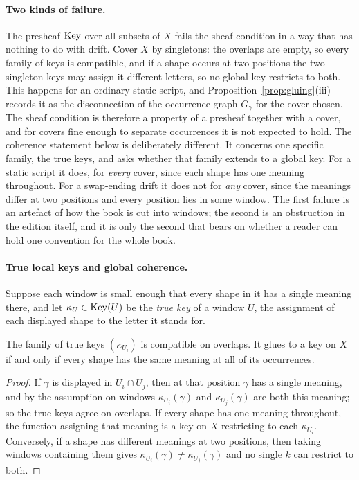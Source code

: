 \paragraph{Two kinds of failure.}
The presheaf $\mathrm{Key}$ over all subsets of $X$ fails the sheaf condition in a way that has nothing to do with drift. Cover $X$ by singletons: the overlaps are empty, so every family of keys is compatible, and if a shape occurs at two positions the two singleton keys may assign it different letters, so no global key restricts to both. This happens for an ordinary static script, and Proposition~\ref{prop:gluing}(iii) records it as the disconnection of the occurrence graph $G_\gamma$ for the cover chosen. The sheaf condition is therefore a property of a presheaf together with a cover, and for covers fine enough to separate occurrences it is not expected to hold. The coherence statement below is deliberately different. It concerns one specific family, the true keys, and asks whether that family extends to a global key. For a static script it does, for \emph{every} cover, since each shape has one meaning throughout. For a swap-ending drift it does not for \emph{any} cover, since the meanings differ at two positions and every position lies in some window. The first failure is an artefact of how the book is cut into windows; the second is an obstruction in the edition itself, and it is only the second that bears on whether a reader can hold one convention for the whole book.

\paragraph{True local keys and global coherence.}
Suppose each window is small enough that every shape in it has a single meaning there, and let $\kappa_U\in\mathrm{Key}(U)$ be the \emph{true key} of a window $U$, the assignment of each displayed shape to the letter it stands for.

\begin{proposition}[Coherence]\label{prop:coherence}
The family of true keys $(\kappa_{U_i})$ is compatible on overlaps. It glues to a key on $X$ if and only if every shape has the same meaning at all of its occurrences.
\end{proposition}

\begin{proof}
If $\gamma$ is displayed in $U_i\cap U_j$, then at that position $\gamma$ has a single meaning, and by the assumption on windows $\kappa_{U_i}(\gamma)$ and $\kappa_{U_j}(\gamma)$ are both this meaning; so the true keys agree on overlaps. If every shape has one meaning throughout, the function assigning that meaning is a key on $X$ restricting to each $\kappa_{U_i}$. Conversely, if a shape has different meanings at two positions, then taking windows containing them gives $\kappa_{U_i}(\gamma)\ne\kappa_{U_j}(\gamma)$ and no single $k$ can restrict to both.
\end{proof}

